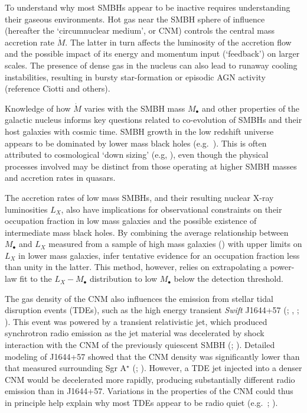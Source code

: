 \documentclass[usenatbib,fleqn]{mn2e}
\newcommand{\Mbh}[1][]{M_{\bullet#1}}
\begin{document}
To understand why most SMBHs appear to be inactive requires understanding their gaseous environments.  Hot gas near the
SMBH sphere of influence (hereafter the `circumnuclear medium', or CNM) controls the central mass accretion rate $\dot{M}$.  The latter in turn affects the luminosity of the accretion flow and the possible impact of its energy and momentum input (`feedback') on larger scales.  The presence of dense gas in the nucleus can also lead to runaway cooling instabilities, resulting in bursty star-formation or episodic AGN activity (reference Ciotti and others).

Knowledge of how $\dot{M}$ varies with the SMBH mass $\Mbh$ and other properties of the
galactic nucleus informs key questions related to co-evolution of SMBHs and their host galaxies with cosmic time.  SMBH growth in the low redshift universe appears to be dominated by lower mass black holes (e.g.~\citealt{Heckman+04}).  This is often
attributed to cosmological `down sizing' (e.g, \citealt{Gallo+08}), even though the physical processes involved may be distinct from those operating at higher SMBH masses and accretion rates in quasars.

The accretion rates of low mass SMBHs, and their resulting nuclear X-ray luminosities $L_X$, also have implications for observational
constraints on their occupation fraction in low mass galaxies and the
possible existence of intermediate mass black holes.  By combining the average relationship between $\Mbh$ and
$L_X$ measured from a sample of high mass galaxies (\citealt{Gallo+08}) with upper limits on $L_X$ in lower mass
galaxies, \citet{MillerGallo+:2014a}  infer tentative evidence for an occupation fraction less than unity in the latter.  This method, however, relies on extrapolating a power-law fit to the $L_X-\Mbh$ distribution to low $\Mbh$ below the detection threshold.  


The gas density of the CNM also influences the emission from stellar tidal disruption events (TDEs), such as the high energy
transient {\it Swift} J1644+57 (\citealt{Levan+11}; \citealt{Bloom+11}, \citealt{Burrows+11}; \citealt{Zauderer+11}).
This event was powered by a transient relativistic jet, which produced
synchrotron radio emission as the jet material was decelerated by
shock interaction with the CNM of the previously quiescent SMBH
(\citealt{Giannios&Metzger11}; \citealt{Zauderer+11}).  Detailed
modeling of J1644+57 showed that the CNM density was
significantly lower than that measured surrounding Sgr A$^{\star}$
(\citealt{Metzger+12}; \citealt{Berger+12}).  However, a TDE jet
injected into a denser CNM would be decelerated more rapidly,
producing substantially different radio emission than in J1644+57.  Variations in the properties of the CNM could thus in
principle help explain why most TDEs appear to be radio quiet
(e.g.~\citealt{Bower+13}; \citealt{VanVelzen+13}).
\end{document}
